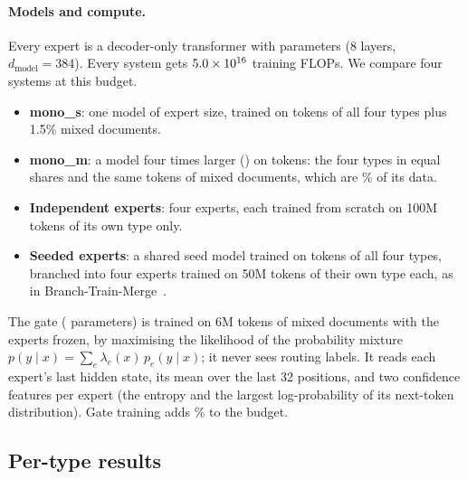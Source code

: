\documentclass[10pt]{article}
\begin{document}
\paragraph{Models and compute.} Every expert is a decoder-only transformer with
\resTrackCParamsS{} parameters (8 layers, $d_{\mathrm{model}}=384$). Every system gets
$5.0\times 10^{16}$ training FLOPs. We compare four systems at this budget.
\begin{itemize}
\item \textbf{mono\_s}: one model of expert size, trained on \resTrackCMonoSTokens{} tokens of all
four types plus 1.5\% mixed documents.
\item \textbf{mono\_m}: a model four times larger (\resTrackCParamsM{}) on \resTrackCMonoMTokens{}
tokens: the four types in equal shares and the same \resTrackCMonoMixedTokens{} tokens of mixed
documents, which are \resTrackCMonoMMixedPct\% of its data.
\item \textbf{Independent experts}: four experts, each trained from scratch on 100M tokens of its
own type only.
\item \textbf{Seeded experts}: a shared seed model trained on \resTrackCSeedTokens{} tokens of
all four types, branched into four experts trained on 50M tokens of their own type each, as in
Branch-Train-Merge~\citep{li2022btm}.
\end{itemize}
The gate (\resTrackCGateParams{} parameters) is trained on 6M tokens of mixed documents with the
experts frozen, by maximising the likelihood of the probability mixture
$p(y\mid x)=\sum_e \lambda_e(x)\,p_e(y\mid x)$; it never sees routing labels. It reads each
expert's last hidden state, its mean over the last 32 positions, and two confidence features per
expert (the entropy and the largest log-probability of its next-token distribution). Gate
training adds \resTrackCGateFlopsPct\% to the budget.

\subsection{Per-type results}
\label{sec:scratch_types}
\end{document}
